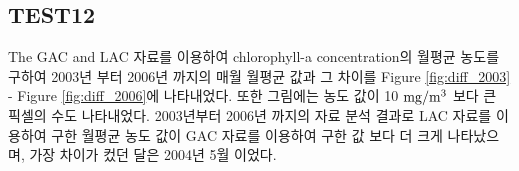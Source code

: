 \subsection{TEST12}
 
The GAC and LAC 자료를 이용하여 chlorophyll-a concentration의 월평균 농도를 구하여 2003년 부터 2006년 까지의 매월 월평균 값과 그 차이를 Figure \ref{fig:diff_2003} - Figure \ref{fig:diff_2006}에 나타내었다. 또한 그림에는 농도 값이 10  ${\rm mg/m^3}$ 보다 큰 픽셀의 수도 나타내었다. 2003년부터 2006년 까지의 자료 분석 결과로 LAC 자료를 이용하여 구한 월평균 농도 값이 GAC 자료를 이용하여 구한 값 보다 더 크게 나타났으며, 가장 차이가 컸던 달은 2004년 5월 이었다.
 


